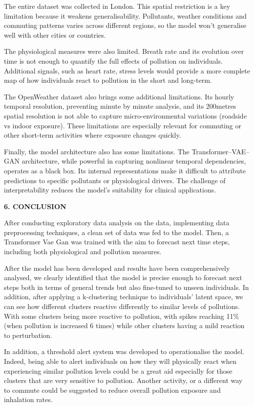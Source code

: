 \documentclass[
]{article}
\begin{document}
The entire dataset was collected in London. This spatial restriction is
a key limitation because it weakens generalisability. Pollutants,
weather conditions and commuting patterns varies across different
regions, so the model won't generalise well with other cities or
countries.

The physiological measures were also limited. Breath rate and its
evolution over time is not enough to quantify the full effects of
pollution on individuals. Additional signals, such as heart rate, stress
levels would provide a more complete map of how individuals react to
pollution in the short and long-term.

The OpenWeather dataset also brings some additional limitations. Its
hourly temporal resolution, preventing minute by minute analysis, and
its 200metres spatial resolution is not able to capture
micro-environmental variations (roadside vs indoor exposure). These
limitations are especially relevant for commuting or other short-term
activities where exposure changes quickly.

Finally, the model architecture also has some limitations. The
Transformer--VAE--GAN architecture, while powerful in capturing
nonlinear temporal dependencies, operates as a black box. Its internal
representations make it difficult to attribute predictions to specific
pollutants or physiological drivers. The challenge of interpretability
reduces the model's suitability for clinical applications.

\textbf{6. CONCLUSION}

After conducting exploratory data analysis on the data, implementing
data preprocessing techniques, a clean set of data was fed to the model.
Then, a Transformer Vae Gan was trained with the aim to forecast next
time steps, including both physiological and pollution measures.

After the model has been developed and results have been comprehensively
analysed, we clearly identified that the model is precise enough to
forecast next steps both in terms of general trends but also fine-tuned
to unseen individuals. In addition, after applying a k-clustering
technique to individuals' latent space, we can see how different
clusters reactive differently to similar levels of pollutions. With some
clusters being more reactive to pollution, with spikes reaching 11\%
(when pollution is increased 6 times) while other clusters having a mild
reaction to perturbation.

In addition, a threshold alert system was developed to operationalise
the model. Indeed, being able to alert individuals on how they will
physically react when experiencing similar pollution levels could be a
great aid especially for those clusters that are very sensitive to
pollution. Another activity, or a different way to commute could be
suggested to reduce overall pollution exposure and inhalation rates.
\end{document}
